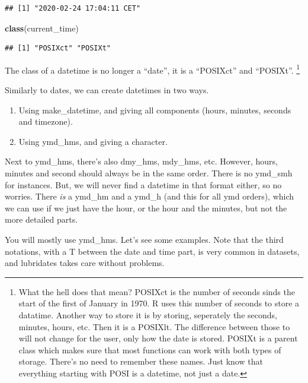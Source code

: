 \documentclass[]{tufte-book}
\newenvironment{Shaded}{}{}
\newcommand{\KeywordTok}[1]{\textcolor[rgb]{0.00,0.44,0.13}{\textbf{#1}}}
\newcommand{\NormalTok}[1]{#1}
\providecommand{\tightlist}{%
  \setlength{\itemsep}{0pt}\setlength{\parskip}{0pt}}
\begin{document}
\begin{verbatim}
## [1] "2020-02-24 17:04:11 CET"
\end{verbatim}

\begin{Shaded}
\begin{Highlighting}[]
\KeywordTok{class}\NormalTok{(current_time)}
\end{Highlighting}
\end{Shaded}

\begin{verbatim}
## [1] "POSIXct" "POSIXt"
\end{verbatim}

The class of a datetime is no longer a ``date'', it is a ``POSIXct'' and ``POSIXt''. \footnote{What the hell does that mean? POSIXct is the number of seconds sinds the start of the first of January in 1970. R uses this number of seconds to store a datatime. Another way to store it is by storing, seperately the seconds, minutes, hours, etc. Then it is a POSIXlt. The difference between those to will not change for the user, only how the date is stored. POSIXt is a parent class which makes sure that most functions can work with both types of storage. There's no need to remember these names. Just know that everything starting with POSI is a datetime, not just a date.}

Similarly to dates, we can create datetimes in two ways.

\begin{enumerate}
\def\labelenumi{\arabic{enumi}.}
\tightlist
\item
  Using make\_datetime, and giving all components (hours, minutes, seconds and timezone).
\item
  Using ymd\_hms, and giving a character.
\end{enumerate}

Next to ymd\_hms, there's also dmy\_hms, mdy\_hms, etc. However, hours, minutes and second should always be in the same order. There is no ymd\_smh for instances. But, we will never find a datetime in that format either, so no worries. There \emph{is} a ymd\_hm and a ymd\_h (and this for all ymd orders), which we can use if we just have the hour, or the hour and the minutes, but not the more detailed parts.

You will mostly use ymd\_hms. Let's see some examples. Note that the third notations, with a T between the date and time part, is very common in datasets, and lubridates takes care without problems.
\end{document}
